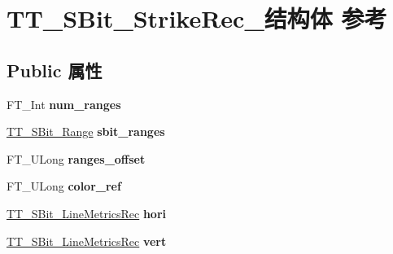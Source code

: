 \hypertarget{struct_t_t___s_bit___strike_rec__}{}\section{T\+T\+\_\+\+S\+Bit\+\_\+\+Strike\+Rec\+\_\+结构体 参考}
\label{struct_t_t___s_bit___strike_rec__}
\subsection*{Public 属性}
\begin{DoxyCompactItemize}
\item 
\mbox{\label{struct_t_t___s_bit___strike_rec___ae35a351f37cdc865f039056cd233d037}} 
F\+T\+\_\+\+Int {\bfseries num\+\_\+ranges}
\item 
\mbox{\label{struct_t_t___s_bit___strike_rec___a63fb916bdfa41489a180af34b4c092a0}} 
\hyperlink{struct_t_t___s_bit___range_rec__}{T\+T\+\_\+\+S\+Bit\+\_\+\+Range} {\bfseries sbit\+\_\+ranges}
\item 
\mbox{\label{struct_t_t___s_bit___strike_rec___a740ed4c52dd359f7db5f47c5c4d9f11b}} 
F\+T\+\_\+\+U\+Long {\bfseries ranges\+\_\+offset}
\item 
\mbox{\label{struct_t_t___s_bit___strike_rec___a5279b83c90ce3c5019575e6a2aaed8e9}} 
F\+T\+\_\+\+U\+Long {\bfseries color\+\_\+ref}
\item 
\mbox{\label{struct_t_t___s_bit___strike_rec___a19b500dbcd1542dcfa92ea7e80f5c21e}} 
\hyperlink{struct_t_t___s_bit___line_metrics_rec__}{T\+T\+\_\+\+S\+Bit\+\_\+\+Line\+Metrics\+Rec} {\bfseries hori}
\item 
\mbox{\label{struct_t_t___s_bit___strike_rec___a5366f6968d1126891f2a6f27345abd5c}} 
\hyperlink{struct_t_t___s_bit___line_metrics_rec__}{T\+T\+\_\+\+S\+Bit\+\_\+\+Line\+Metrics\+Rec} {\bfseries vert}
\item 
\mbox{\label{struct_t_t___s_bit___strike_rec___a05032d4092eef7e7214bb82d4113d8b9}} 

\end{DoxyCompactItemize}
